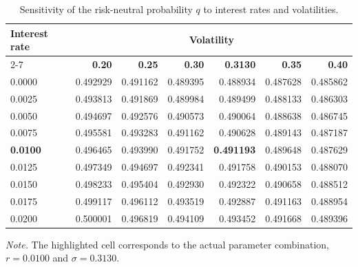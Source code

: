 \documentclass[hidelinks, 12pt, a4paper]{article}
\theoremstyle{definition}
\begin{document}
\begin{table}[H]
  \centering
  \caption{Sensitivity of the risk-neutral probability \(q\) to interest rates and volatilities.}
  \label{tab:sensitivity_rates_volatility}

  \small
  \setlength{\tabcolsep}{6pt}
  \renewcommand{\arraystretch}{1.15}

  \begin{tabular}{lrrr>{\columncolor{gray!10}}rrr}
    \toprule
    \textbf{Interest rate}
    & \multicolumn{6}{c}{\textbf{Volatility}} \\
    \cmidrule(lr){2-7}
    & {\textbf{0.20}}
    & {\textbf{0.25}}
    & {\textbf{0.30}}
    & {\cellcolor{gray!10}\textbf{0.3130}}
    & {\textbf{0.35}}
    & {\textbf{0.40}} \\
    \midrule
    0.0000 & 0.492929 & 0.491162 & 0.489395 & 0.488934 & 0.487628 & 0.485862 \\
    0.0025 & 0.493813 & 0.491869 & 0.489984 & 0.489499 & 0.488133 & 0.486303 \\
    0.0050 & 0.494697 & 0.492576 & 0.490573 & 0.490064 & 0.488638 & 0.486745 \\
    0.0075 & 0.495581 & 0.493283 & 0.491162 & 0.490628 & 0.489143 & 0.487187 \\

    \rowcolor{gray!10}
    \textbf{0.0100}
    & 0.496465
    & 0.493990
    & 0.491752
    & \cellcolor{gray!25}\textbf{0.491193}
    & 0.489648
    & 0.487629 \\

    0.0125 & 0.497349 & 0.494697 & 0.492341 & 0.491758 & 0.490153 & 0.488070 \\
    0.0150 & 0.498233 & 0.495404 & 0.492930 & 0.492322 & 0.490658 & 0.488512 \\
    0.0175 & 0.499117 & 0.496112 & 0.493519 & 0.492887 & 0.491163 & 0.488954 \\
    0.0200 & 0.500001 & 0.496819 & 0.494109 & 0.493452 & 0.491668 & 0.489396 \\
    \bottomrule
  \end{tabular}

  \vspace{2mm}
  \begin{minipage}{0.92\textwidth}
    \footnotesize
    \textit{Note.} The highlighted cell corresponds to the actual parameter combination,
    \(r = 0.0100\) and \(\sigma = 0.3130\).
  \end{minipage}
\end{table}
\end{document}

